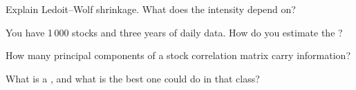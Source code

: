 \begin{interviewq}\label{iq:qm:covariance-estimation-and-random-matrices:3}
Explain Ledoit--Wolf shrinkage. What does the intensity depend on?
\end{interviewq}

\begin{interviewq}\label{iq:qm:covariance-estimation-and-random-matrices:4}
You have 1\,000 stocks and three years of daily data. How do you estimate the ?
\end{interviewq}

\begin{interviewq}\label{iq:qm:covariance-estimation-and-random-matrices:5}
How many principal components of a stock correlation matrix carry information?
\end{interviewq}

\begin{interviewq}\label{iq:qm:covariance-estimation-and-random-matrices:6}
What is a , and what is the best one could do in that class?
\end{interviewq}
